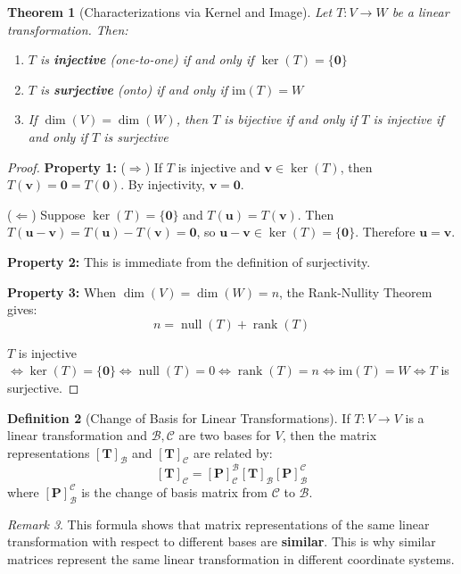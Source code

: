 \documentclass[12pt]{article}
\numberwithin{equation}{section}
\newcommand{\vect}[1]{\boldsymbol{#1}}   %
\newcommand{\mat}[1]{\mathbf{#1}}        %
\newcommand{\rank}{\operatorname{rank}}
\newcommand{\nullity}{\operatorname{null}}
\theoremstyle{plain}
\newtheorem{theorem}{Theorem}[section]
\theoremstyle{definition}
\newtheorem{definition}[theorem]{Definition}
\theoremstyle{remark}
\newtheorem{remark}[theorem]{Remark}
\begin{document}
\begin{theorem}[Characterizations via Kernel and Image]
Let $T: V \to W$ be a linear transformation. Then:
\begin{enumerate}
\item $T$ is \textbf{injective} (one-to-one) if and only if $\ker(T) = \{\vect{0}\}$
\item $T$ is \textbf{surjective} (onto) if and only if $\text{im}(T) = W$
\item If $\dim(V) = \dim(W)$, then $T$ is bijective if and only if $T$ is injective if and only if $T$ is surjective
\end{enumerate}
\end{theorem}

\begin{proof}
\textbf{Property 1:}
($\Rightarrow$) If $T$ is injective and $\vect{v} \in \ker(T)$, then $T(\vect{v}) = \vect{0} = T(\vect{0})$. By injectivity, $\vect{v} = \vect{0}$.

($\Leftarrow$) Suppose $\ker(T) = \{\vect{0}\}$ and $T(\vect{u}) = T(\vect{v})$. Then $T(\vect{u} - \vect{v}) = T(\vect{u}) - T(\vect{v}) = \vect{0}$, so $\vect{u} - \vect{v} \in \ker(T) = \{\vect{0}\}$. Therefore $\vect{u} = \vect{v}$.

\textbf{Property 2:} This is immediate from the definition of surjectivity.

\textbf{Property 3:} When $\dim(V) = \dim(W) = n$, the Rank-Nullity Theorem gives:
$$n = \nullity(T) + \rank(T)$$

$T$ is injective $\Leftrightarrow \ker(T) = \{\vect{0}\} \Leftrightarrow \nullity(T) = 0 \Leftrightarrow \rank(T) = n \Leftrightarrow \text{im}(T) = W \Leftrightarrow T$ is surjective.
\end{proof}

\begin{definition}[Change of Basis for Linear Transformations]
If $T: V \to V$ is a linear transformation and $\mathcal{B}, \mathcal{C}$ are two bases for $V$, then the matrix representations $[\mat{T}]_{\mathcal{B}}$ and $[\mat{T}]_{\mathcal{C}}$ are related by:
$$[\mat{T}]_{\mathcal{C}} = [\mat{P}]_{\mathcal{C}}^{\mathcal{B}} [\mat{T}]_{\mathcal{B}} [\mat{P}]_{\mathcal{B}}^{\mathcal{C}}$$
where $[\mat{P}]_{\mathcal{B}}^{\mathcal{C}}$ is the change of basis matrix from $\mathcal{C}$ to $\mathcal{B}$.
\end{definition}

\begin{remark}
This formula shows that matrix representations of the same linear transformation with respect to different bases are \textbf{similar}. This is why similar matrices represent the same linear transformation in different coordinate systems.
\end{remark}
\end{document}
